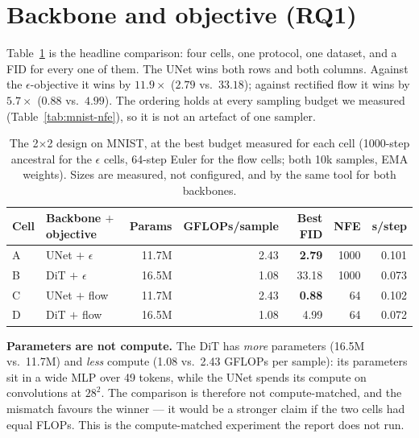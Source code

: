 \documentclass{article}
\begin{document}
\section{Backbone and objective (RQ1)}
\label{sec:backbone}

Table~\ref{tab:2x2} is the headline comparison: four cells, one protocol, one dataset, and a
FID for every one of them. The UNet wins both rows and both columns. Against the
$\epsilon$-objective it wins by $11.9\times$ ($2.79$ vs.\ $33.18$); against rectified flow it
wins by $5.7\times$ ($0.88$ vs.\ $4.99$). The ordering holds at every sampling budget we
measured (Table~\ref{tab:mnist-nfe}), so it is not an artefact of one sampler.

\begin{table}[t]
  \caption{The 2$\times$2 design on MNIST, at the best budget measured for each cell
  (1000-step ancestral for the $\epsilon$ cells, 64-step Euler for the flow cells; both
  10k samples, EMA weights). Sizes are measured, not configured, and by the same tool for
  both backbones.}
  \label{tab:2x2}
  \centering
  \small
  \begin{tabular}{@{}llrrrrr@{}}
    \toprule
    Cell & Backbone $+$ objective & Params & GFLOPs/sample & Best FID & NFE & s/step \\
    \midrule
    A & UNet $+$ $\epsilon$ & 11.7M & 2.43 & \textbf{2.79} & 1000 & 0.101 \\
    B & DiT $+$ $\epsilon$  & 16.5M & 1.08 & 33.18 & 1000 & 0.073 \\
    C & UNet $+$ flow       & 11.7M & 2.43 & \textbf{0.88} & 64 & 0.102 \\
    D & DiT $+$ flow        & 16.5M & 1.08 &  4.99 & 64 & 0.072 \\
    \bottomrule
  \end{tabular}
\end{table}

\textbf{Parameters are not compute.} The DiT has \emph{more} parameters (16.5M vs.\ 11.7M)
and \emph{less} compute (1.08 vs.\ 2.43 GFLOPs per sample): its parameters sit in a wide MLP
over 49 tokens, while the UNet spends its compute on convolutions at $28^2$. The comparison
is therefore not compute-matched, and the mismatch favours the winner --- it would be a
stronger claim if the two cells had equal FLOPs. This is the compute-matched experiment the
report does not run.
\end{document}
